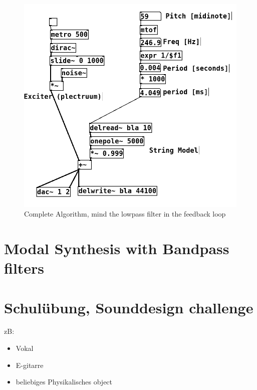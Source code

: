 \begin{figure}[H]
  \begin{center}
    \includegraphics[scale = 0.3]{img/karplusComplete.png}
    \caption{Complete Algorithm, mind the lowpass filter in the feedback loop}
    \label{fig:karplusComplete}
  \end{center}
\end{figure}



\section{Modal Synthesis with Bandpass filters}


\section{Schulübung, Sounddesign challenge}

zB:
\begin{itemize}
	\item Vokal
	\item E-gitarre
	\item beliebiges Physikalisches object

\end{itemize}



